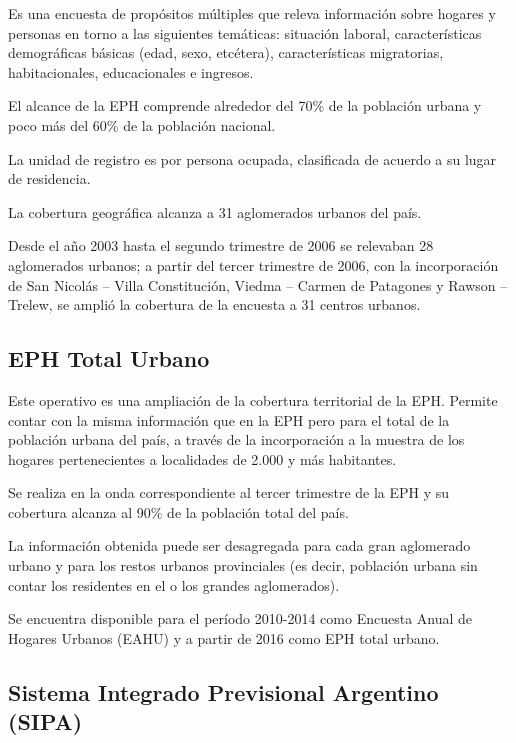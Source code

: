 \documentclass[
  openany]{book}
\begin{document}
Es una encuesta de propósitos múltiples que releva información sobre hogares y personas en torno a las siguientes temáticas: situación laboral, características demográficas básicas (edad, sexo, etcétera), características migratorias, habitacionales, educacionales e ingresos.

El alcance de la EPH comprende alrededor del 70\% de la población urbana y poco más del 60\% de la población nacional.

La unidad de registro es por persona ocupada, clasificada de acuerdo a su lugar de residencia.

La cobertura geográfica alcanza a 31 aglomerados urbanos del país.

Desde el año 2003 hasta el segundo trimestre de 2006 se relevaban 28 aglomerados urbanos; a partir del tercer trimestre de 2006, con la incorporación de San Nicolás -- Villa Constitución, Viedma -- Carmen de Patagones y Rawson -- Trelew, se amplió la cobertura de la encuesta a 31 centros urbanos.

\hypertarget{eph-total-urbano}{%
\subsection{EPH Total Urbano}\label{eph-total-urbano}}

Este operativo es una ampliación de la cobertura territorial de la EPH. Permite contar con la misma información que en la EPH pero para el total de la población urbana del país, a través de la incorporación a la muestra de los hogares pertenecientes a localidades de 2.000 y más habitantes.

Se realiza en la onda correspondiente al tercer trimestre de la EPH y su cobertura alcanza al 90\% de la población total del país.

La información obtenida puede ser desagregada para cada gran aglomerado urbano y para los restos urbanos provinciales (es decir, población urbana sin contar los residentes en el o los grandes aglomerados).

Se encuentra disponible para el período 2010-2014 como Encuesta Anual de Hogares Urbanos (EAHU) y a partir de 2016 como EPH total urbano.

\hypertarget{sistema-integrado-previsional-argentino-sipa}{%
\subsection{Sistema Integrado Previsional Argentino (SIPA)}\label{sistema-integrado-previsional-argentino-sipa}}
\end{document}
